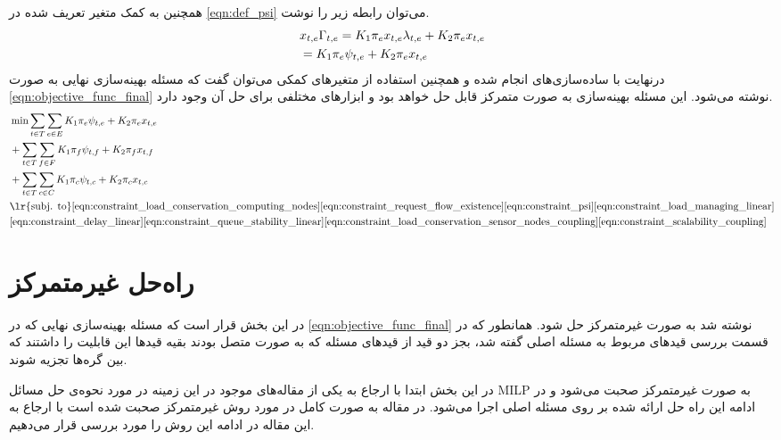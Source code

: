 	همچنین به کمک متغیر تعریف شده در \cref{eqn:def_psi}	می‌توان رابطه زیر را نوشت.
	\begin{align}
		&\notag x_{t,e}\Gamma_{t,e} = K_1\pi_ex_{t,e}\lambda_{t,e} + K_2\pi_ex_{t,e} \\
		&= K_1\pi_e\psi_{t,e} + K_2\pi_ex_{t,e}
	\end{align}
	درنهایت با ساده‌سازی‌های انجام شده و همچنین استفاده از متغیرهای کمکی می‌توان گفت که مسئله بهینه‌سازی نهایی به صورت \cref{eqn:objective_func_final} نوشته می‌شود. این مسئله بهینه‌سازی به صورت متمرکز قابل حل خواهد بود و ابزارهای مختلفی برای حل آن وجود دارد.
	\begin{align}
		&\min \sum_{t \in T}\sum_{e \in E} K_1\pi_e\psi_{t,e}+K_2\pi_ex_{t,e}\notag \\
		&+\sum_{t \in T}\sum_{f \in F} K_1\pi_f\psi_{t,f}+K_2\pi_fx_{t,f}\notag \\
		&+\sum_{t \in T}\sum_{c \in C} K_1\pi_c\psi_{t,c}+K_2\pi_cx_{t,c} \label{eqn:objective_func_final} \notag \\
		&\text{\lr{subj. to}}
		\cref{eqn:constraint_load_conservation_computing_nodes}
		\cref{eqn:constraint_request_flow_existence}\cref{eqn:constraint_psi}
		\cref{eqn:constraint_load_managing_linear} \notag \\
		&\cref{eqn:constraint_delay_linear}
		\cref{eqn:constraint_queue_stability_linear}
		\cref{eqn:constraint_load_conservation_sensor_nodes_coupling}
		\cref{eqn:constraint_scalability_coupling}
	\end{align}
	\section{راه‌حل غیرمتمرکز}\label{subsection:decentralized}
	در این بخش قرار است که مسئله بهینه‌سازی نهایی که در \cref{eqn:objective_func_final} نوشته شد به صورت غیرمتمرکز حل شود. 
	همانطور که در قسمت بررسی قیدهای مربوط به مسئله اصلی گفته شد، بجز دو قید از قیدهای مسئله که به صورت متصل بودند بقیه قیدها این قابلیت را داشتند که بین گره‌ها تجزیه شوند. 
	
	در این بخش ابتدا با ارجاع به یکی از مقاله‌های موجود در این زمینه در مورد نحوه‌ی حل مسائل MILP به صورت غیرمتمرکز صحبت می‌شود و در ادامه این راه حل ارائه شده بر روی مسئله اصلی اجرا می‌شود. 
	در مقاله \cite{decentralized_approach} به صورت کامل در مورد روش غیرمتمرکز صحبت شده است با ارجاع به این مقاله در ادامه این روش را مورد بررسی قرار می‌دهیم. 
	
